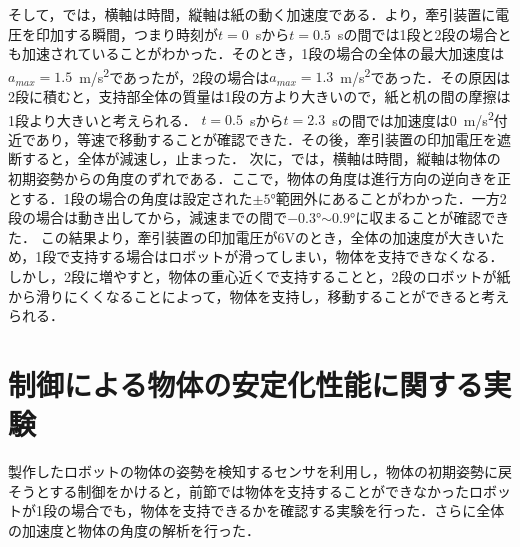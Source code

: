 そして，では，横軸は時間，縦軸は紙の動く加速度である．より，牽引装置に電圧を印加する瞬間，つまり時刻が$t=0$~sから$t=0.5$~sの間では1段と2段の場合とも加速されていることがわかった．そのとき，1段の場合の全体の最大加速度は$a_{max}=1.5$~\si{m/s^2}であったが，2段の場合は$a_{max}=1.3$~\si{m/s^2}であった．その原因は2段に積むと，支持部全体の質量は1段の方より大きいので，紙と机の間の摩擦は1段より大きいと考えられる．
$t=0.5$~sから$t=2.3$~sの間では加速度は0~\si{m/s^2}付近であり，等速で移動することが確認できた．その後，牽引装置の印加電圧を遮断すると，全体が減速し，止まった．
次に，では，横軸は時間，縦軸は物体の初期姿勢からの角度のずれである．ここで，物体の角度は進行方向の逆向きを正とする．1段の場合の角度は設定された$\pm5$\si{\degree}範囲外にあることがわかった．一方2段の場合は動き出してから，減速までの間で$-0.3$\si{\degree}$\sim0.9$\si{\degree}に収まることが確認できた．
この結果より，牽引装置の印加電圧が6Vのとき，全体の加速度が大きいため，1段で支持する場合はロボットが滑ってしまい，物体を支持できなくなる．しかし，2段に増やすと，物体の重心近くで支持することと，2段のロボットが紙から滑りにくくなることによって，物体を支持し，移動することができると考えられる．

\section{制御による物体の安定化性能に関する実験}
\label{section:exp3}
製作したロボットの物体の姿勢を検知するセンサを利用し，物体の初期姿勢に戻そうとする制御をかけると，前節では物体を支持することができなかったロボットが1段の場合でも，物体を支持できるかを確認する実験を行った．さらに全体の加速度と物体の角度の解析を行った．

